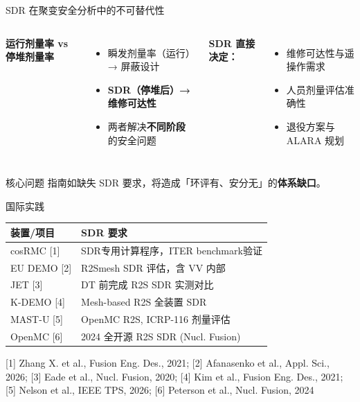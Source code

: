 \documentclass[aspectratio=169]{ctexbeamer}
\begin{document}
\begin{frame}{SDR 在聚变安全分析中的不可替代性}
	\begin{columns}[T]
		\textbf{运行剂量率 vs 停堆剂量率}
		\begin{itemize}
			\item 瞬发剂量率（运行）→ 屏蔽设计
			\item \textbf{SDR（停堆后）→ 维修可达性}
			\item 两者解决\textbf{不同阶段}的安全问题
		\end{itemize}

		\textbf{SDR 直接决定：}
		\begin{itemize}
			\item 维修可达性与遥操作需求
			\item 人员剂量评估准确性
			\item 退役方案与 ALARA 规划
		\end{itemize}
	\end{columns}

	\vspace{8pt}
	\begin{alertblock}{核心问题}
		指南如缺失 SDR 要求，将造成「环评有、安分无」的\textbf{体系缺口}。
	\end{alertblock}
\end{frame}

\begin{frame}{国际实践}
	\begin{table}
		\small
		\begin{tabular}{p{2.8cm} p{6.5cm}}
			\toprule
			\textbf{装置/项目} & \textbf{SDR 要求}                 \\
			\midrule
			cosRMC [1]     & SDR专用计算程序，ITER benchmark验证      \\
			EU DEMO [2]    & R2Smesh SDR 评估，含 VV 内部          \\
			JET [3]        & DT 前完成 R2S SDR 实测对比             \\
			K-DEMO [4]     & Mesh-based R2S 全装置 SDR          \\
			MAST-U [5]     & OpenMC R2S, ICRP-116 剂量评估       \\
			OpenMC [6]     & 2024 全开源 R2S SDR (Nucl. Fusion) \\
			\bottomrule
		\end{tabular}
	\end{table}

	\vspace{6pt}
	{\footnotesize [1] Zhang X. et al., Fusion Eng. Des., 2021; [2] Afanasenko et al., Appl. Sci., 2026; [3] Eade et al., Nucl. Fusion, 2020; [4] Kim et al., Fusion Eng. Des., 2021; [5] Nelson et al., IEEE TPS, 2026; [6] Peterson et al., Nucl. Fusion, 2024}
\end{frame}
\end{document}
